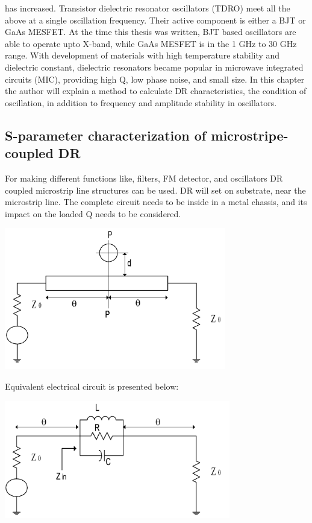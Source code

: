 has increased. Transistor dielectric resonator oscillators (TDRO) meet
all the above at a single oscillation frequency. Their active component
is either a BJT or GaAs MESFET. At the time this thesis was written, BJT
based oscillators are able to operate upto X-band, while GaAs MESFET is
in the 1 GHz to 30 GHz range. With development of materials with high
temperature stability and dielectric constant, dielectric resonators
became popular in microwave integrated circuits (MIC), providing high Q,
low phase noise, and small size. In this chapter the author will explain
a method to calculate DR characteristics, the condition of oscillation,
in addition to frequency and amplitude stability in oscillators.

\hypertarget{s-parameter-characterization-of-microstripe-coupled-dr}{%
\subsection{S-parameter characterization of microstripe-coupled
DR}\label{s-parameter-characterization-of-microstripe-coupled-dr}}

For making different functions like, filters, FM detector, and
oscillators DR coupled microstrip line structures can be used. DR will
set on substrate, near the microstrip line. The complete circuit needs
to be inside in a metal chassis, and its impact on the loaded Q needs to
be considered.

\includegraphics[width=3.8125in,height=2.4375in]{media/image2.png}

Equivalent electrical circuit is presented below:

\includegraphics[width=3.88542in,height=2.03125in]{media/image3.png}

